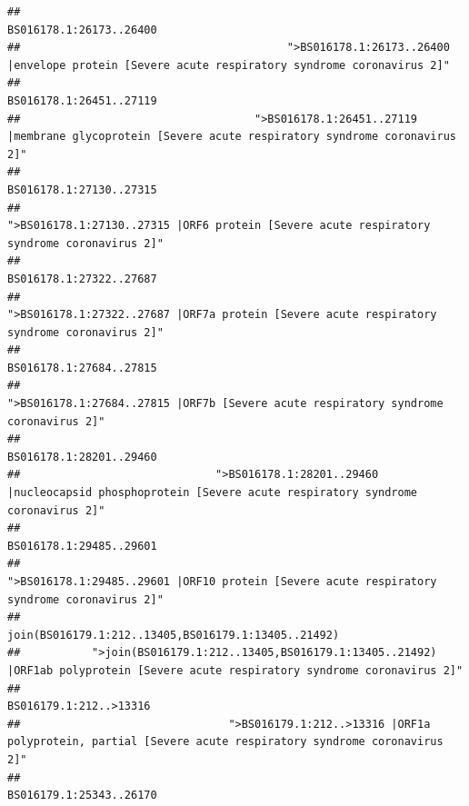 \documentclass[
]{article}
\begin{document}
\begin{verbatim}
##                                                                                                                BS016178.1:26173..26400 
##                                         ">BS016178.1:26173..26400 |envelope protein [Severe acute respiratory syndrome coronavirus 2]" 
##                                                                                                                BS016178.1:26451..27119 
##                                    ">BS016178.1:26451..27119 |membrane glycoprotein [Severe acute respiratory syndrome coronavirus 2]" 
##                                                                                                                BS016178.1:27130..27315 
##                                             ">BS016178.1:27130..27315 |ORF6 protein [Severe acute respiratory syndrome coronavirus 2]" 
##                                                                                                                BS016178.1:27322..27687 
##                                            ">BS016178.1:27322..27687 |ORF7a protein [Severe acute respiratory syndrome coronavirus 2]" 
##                                                                                                                BS016178.1:27684..27815 
##                                                    ">BS016178.1:27684..27815 |ORF7b [Severe acute respiratory syndrome coronavirus 2]" 
##                                                                                                                BS016178.1:28201..29460 
##                              ">BS016178.1:28201..29460 |nucleocapsid phosphoprotein [Severe acute respiratory syndrome coronavirus 2]" 
##                                                                                                                BS016178.1:29485..29601 
##                                            ">BS016178.1:29485..29601 |ORF10 protein [Severe acute respiratory syndrome coronavirus 2]" 
##                                                                                    join(BS016179.1:212..13405,BS016179.1:13405..21492) 
##           ">join(BS016179.1:212..13405,BS016179.1:13405..21492) |ORF1ab polyprotein [Severe acute respiratory syndrome coronavirus 2]" 
##                                                                                                                 BS016179.1:212..>13316 
##                                ">BS016179.1:212..>13316 |ORF1a polyprotein, partial [Severe acute respiratory syndrome coronavirus 2]" 
##                                                                                                                BS016179.1:25343..26170 

\end{verbatim}
\end{document}
